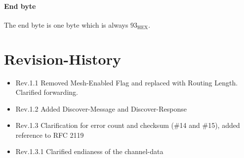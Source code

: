 \documentclass{scrreprt}
\begin{document}
\subsubsection{End byte}
The end byte is one byte which is always $93_\text{HEX}$.

\pagebreak
\chapter{Revision-History}
\begin{itemize}
  \item Rev.1.1 Removed Mesh-Enabled Flag and replaced with Routing Length. Clarified forwarding.
  \item Rev.1.2 Added Discover-Message and Discover-Response
  \item Rev.1.3 Clarification for error count and checksum (\#14 and \#15), added reference to RFC 2119
  \item Rev.1.3.1 Clarified endianess of the channel-data
\end{itemize}
\end{document}
